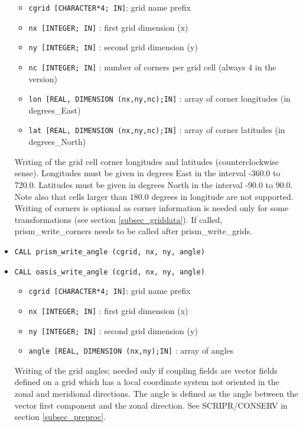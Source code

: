 \begin{itemize}
 \begin{itemize}
    \item {\tt cgrid [CHARACTER*4; IN]}: grid name prefix
    \item {\tt nx [INTEGER; IN]} : first grid dimension (x)
    \item {\tt ny [INTEGER; IN]} : second grid dimension (y)
    \item {\tt nc [INTEGER; IN]} : number of corners per grid cell (always 4 in the version)
    \item {\tt lon [REAL, DIMENSION (nx,ny,nc);IN]} : array of corner
    longitudes (in degrees\_East)
    \item {\tt lat [REAL, DIMENSION (nx,ny,nc);IN]} : array of corner
    latitudes (in degrees\_North)
 \end{itemize}

 Writing of the grid cell corner longitudes and latitudes
 (counterclockwise sense). Longitudes must be given in degrees East in
 the interval -360.0 to 720.0. Latitudes must be given in degrees
 North in the interval -90.0 to 90.0. Note also that cells larger than
 180.0 degrees in longitude are not supported. Writing of corners is
 optional as corner information is needed only for some
 transformations (see section \ref{subsec_griddata}). If called,
 prism\_write\_corners needs to be called after prism\_write\_grids.

\item {\tt CALL prism\_write\_angle (cgrid, nx, ny, angle)}
\item {\tt CALL oasis\_write\_angle (cgrid, nx, ny, angle)}

 \begin{itemize}
    \item {\tt cgrid [CHARACTER*4; IN]}: grid name prefix
    \item {\tt nx [INTEGER; IN]} : first grid dimension (x)
    \item {\tt ny [INTEGER; IN]} : second grid dimension (y)
    \item {\tt angle [REAL, DIMENSION (nx,ny);IN]} : array of angles
 \end{itemize}

 Writing of the grid angles; needed only if coupling fields
 are vector fields defined on a grid which has a local coordinate system not oriented in 
 the zonal and meridional directions. The angle is defined as the angle between the vector
 first component and the zonal direction. See SCRIPR/CONSERV in section \ref{subsec_preproc}.


\end{itemize}
